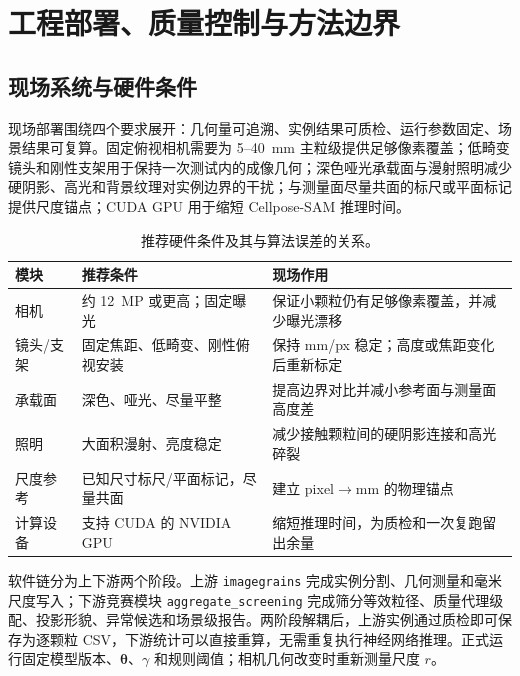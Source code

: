 \section{工程部署、质量控制与方法边界}
\label{sec:r-deploy}

\subsection{现场系统与硬件条件}

现场部署围绕四个要求展开：几何量可追溯、实例结果可质检、运行参数固定、场景结果可复算。固定俯视相机需要为 5--40~mm 主粒级提供足够像素覆盖；低畸变镜头和刚性支架用于保持一次测试内的成像几何；深色哑光承载面与漫射照明减少硬阴影、高光和背景纹理对实例边界的干扰；与测量面尽量共面的标尺或平面标记提供尺度锚点；CUDA GPU 用于缩短 Cellpose-SAM 推理时间。

\begin{table}[H]
\centering
\caption{推荐硬件条件及其与算法误差的关系。}
\label{tab:r-hardware}
\footnotesize
\renewcommand{\arraystretch}{1.12}
\begin{tabular}{>{\raggedright\arraybackslash}p{2.0cm}>{\raggedright\arraybackslash}p{5.0cm}>{\raggedright\arraybackslash}p{7.0cm}}
\toprule
模块 & 推荐条件 & 现场作用 \\
\midrule
相机 & 约 12~MP 或更高；固定曝光 & 保证小颗粒仍有足够像素覆盖，并减少曝光漂移 \\
镜头/支架 & 固定焦距、低畸变、刚性俯视安装 & 保持 mm/px 稳定；高度或焦距变化后重新标定 \\
承载面 & 深色、哑光、尽量平整 & 提高边界对比并减小参考面与测量面高度差 \\
照明 & 大面积漫射、亮度稳定 & 减少接触颗粒间的硬阴影连接和高光碎裂 \\
尺度参考 & 已知尺寸标尺/平面标记，尽量共面 & 建立 pixel$\rightarrow$mm 的物理锚点 \\
计算设备 & 支持 CUDA 的 NVIDIA GPU & 缩短推理时间，为质检和一次复跑留出余量 \\
\bottomrule
\end{tabular}
\end{table}

软件链分为上下游两个阶段。上游 \texttt{imagegrains} 完成实例分割、几何测量和毫米尺度写入；下游竞赛模块 \texttt{aggregate\_screening} 完成筛分等效粒径、质量代理级配、投影形貌、异常候选和场景级报告。两阶段解耦后，上游实例通过质检即可保存为逐颗粒 CSV，下游统计可以直接重算，无需重复执行神经网络推理。正式运行固定模型版本、$\boldsymbol{\theta}$、$\gamma$ 和规则阈值；相机几何改变时重新测量尺度 $r$。

